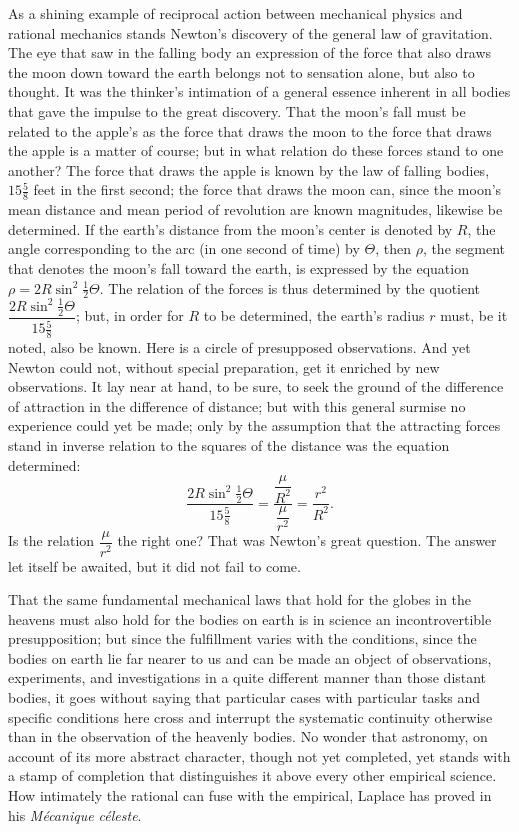 \documentclass[12pt]{book}
\begin{document}
As a shining example of reciprocal action between mechanical physics and rational
mechanics stands Newton's discovery of the general law of gravitation. The eye that
saw in the falling body an expression of the force that also draws the moon down
toward the earth belongs not to sensation alone, but also to thought. It was the
thinker's intimation of a general essence inherent in all bodies that gave the impulse
to the great discovery. That the moon's fall must be related to the apple's as the
force that draws the moon to the force that draws the apple is a matter of course; but
in what relation do these forces stand to one another? The force that draws the apple
is known by the law of falling bodies, $15\tfrac58$ feet in the first second; the
force that draws the moon can, since the moon's mean distance and mean period of
revolution are known magnitudes, likewise be determined. If the earth's distance from
the moon's center is denoted by $R$, the angle corresponding to the arc (in one second
of time) by $\Theta$, then $\rho$, the segment that denotes the moon's fall toward the
earth, is expressed by the equation $\rho = 2R\sin^2\tfrac12\Theta$. The relation of
the forces is thus determined by the quotient
$\dfrac{2R\sin^2\tfrac12\Theta}{15\tfrac58}$; but, in order for $R$ to be determined,
the earth's radius $r$ must, be it noted, also be known. Here is a circle of
presupposed observations. And yet Newton could not, without special preparation, get
it enriched by new observations. It lay near at hand, to be sure, to seek the ground
of the difference of attraction in the difference of distance; but with this general
surmise no experience could yet be made; only by the assumption that the attracting
forces stand in inverse relation to the squares of the distance was the equation
determined:
\[
  \frac{2R\sin^2\tfrac12\Theta}{15\tfrac58} = \frac{\dfrac{\mu}{R^2}}{\dfrac{\mu}{r^2}} = \frac{r^2}{R^2}.
\]
Is the relation $\dfrac{\mu}{r^2}$ the right one? That was Newton's great question. The
answer let itself be awaited, but it did not fail to come.

That the same fundamental mechanical laws that hold for the globes in the heavens must
also hold for the bodies on earth is in science an incontrovertible presupposition;
but since the fulfillment varies with the conditions, since the bodies on earth lie far
nearer to us and can be made an object of observations, experiments, and
investigations in a quite different manner than those distant bodies, it goes without
saying that particular cases with particular tasks and specific conditions here cross
and interrupt the systematic continuity otherwise than in the observation of the
heavenly bodies. No wonder that astronomy, on account of its more abstract character,
though not yet completed, yet stands with a stamp of completion that distinguishes it
above every other empirical science. How intimately the rational can fuse with the
empirical, Laplace has proved in his \textit{Mécanique céleste}.
\end{document}
